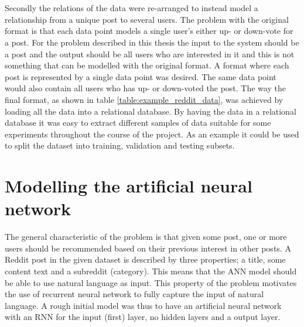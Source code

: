 \\\\
Secondly the relations of the data were re-arranged to instead model a relationship from a unique post to several users. The problem with the original format is that each data point models a single user's either up- or down-vote for a post. For the problem described in this thesis the input to the system should be a post and the output should be all users who are interested in it and this is not something that can be modelled with the original format. A format where each post is represented by a single data point was desired. The same data point would also contain all users who has up- or down-voted the post. The way the final format, as shown in table \ref{table:example_reddit_data}, was achieved by loading all the data into a relational database. By having the data in a relational database it was easy to extract different samples of data suitable for some experiments throughout the course of the project. As an example it could be used to split the dataset into training, validation and testing subsets.

\section{Modelling the artificial neural network}\label{sec:modelling_the_ann}
The general characteristic of the problem is that given some post, one or more users should be recommended based on their previous interest in other posts. A Reddit post in the given dataset is described by three properties; a title, some content text and a subreddit (category). This means that the ANN model should be able to use natural language as input. This property of the problem motivates the use of recurrent neural network to fully capture the input of natural language. A rough initial model was thus to have an artificial neural network with an RNN for the input (first) layer, no hidden layers and a output layer.

